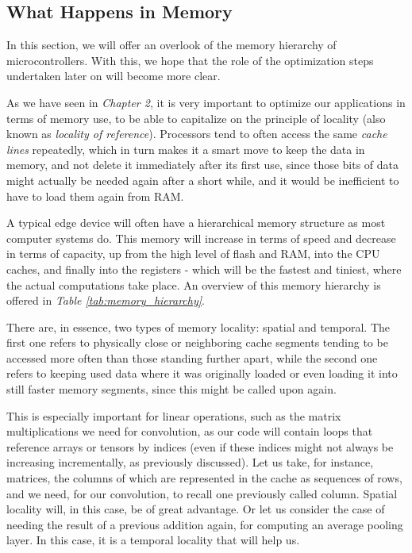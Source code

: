 \subsection{What Happens in Memory}
In this section, we will offer an overlook of the memory hierarchy of microcontrollers. With this, we hope that the role of the optimization steps undertaken later on will become more clear. \par
As we have seen in \textit{Chapter 2}, it is very important to optimize our applications in terms of memory use, to be able to capitalize on the principle of locality (also known as \textit{locality of reference}). \cite{memory_local} Processors tend to often access the same \textit{cache lines} repeatedly, which in turn makes it a smart move to keep the data in memory, and not delete it immediately after its first use, since those bits of data might actually be needed again after a short while, and it would be inefficient to have to load them again from RAM. \par
A typical edge device will often have a hierarchical memory structure as most computer systems do. This memory will increase in terms of speed and decrease in terms of capacity, up from the high level of flash and RAM, into the CPU caches, and finally into the registers - which will be the fastest and tiniest, where the actual computations take place. An overview of this memory hierarchy is offered in \textit{Table \ref{tab:memory_hierarchy}}. \par
There are, in essence, two types of memory locality: spatial and temporal. The first one refers to physically close or neighboring cache segments tending to be accessed more often than those standing further apart, while the second one refers to keeping used data where it was originally loaded or even loading it into still faster memory segments, since this might be called upon again. \cite{computer_org_anddesign} \par
This is especially important for linear operations, such as the matrix multiplications we need for convolution, as our code will contain loops that reference arrays or tensors by indices (even if these indices might not always be increasing incrementally, as previously discussed). Let us take, for instance, matrices, the columns of which are represented in the cache as sequences of rows, and we need, for our convolution, to recall one previously called column. Spatial locality will, in this case, be of great advantage. Or let us consider the case of needing the result of a previous addition again, for computing an average pooling layer. In this case, it is a temporal locality that will help us.

